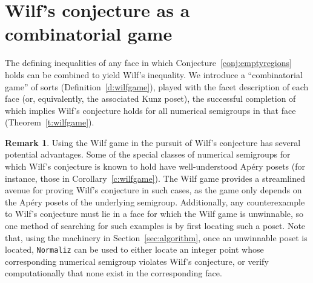 \documentclass[12pt]{amsart}
\theoremstyle{definition}
\newtheorem{remark}[thm]{Remark}
\numberwithin{equation}{section}
\renewcommand\>{\rangle}
\newcommand\<{\langle}
\newcommand\0{\mathbf{0}}
\begin{document}
\section{Wilf's conjecture as a combinatorial game}%
\label{sec:game}%

The defining inequalities of any face in which Conjecture~\ref{conj:emptyregions} holds can be combined to yield Wilf's inequality.  We introduce a ``combinatorial game'' of sorts (Definition~\ref{d:wilfgame}), played with the facet description of each face (or, equivalently, the associated Kunz poset), the successful completion of which implies Wilf's conjecture holds for all numerical semigroups in that face (Theorem~\ref{t:wilfgame}).  

\begin{remark}\label{r:wilfgameadvantages}
Using the Wilf game in the pursuit of Wilf's conjecture has several potential advantages.  Some of the special classes of numerical semigroups for which Wilf's conjecture is known to hold have well-understood Ap\'ery posets (for instance, those in Corollary~\ref{c:wilfgame}).  The Wilf game provides a streamlined avenue for proving Wilf's conjecture in such cases, as the game only depends on the Ap\'ery posets of the underlying semigroup.  
Additionally, any counterexample to Wilf's conjecture must lie in a face for which the Wilf game is unwinnable, so one method of searching for such examples is by first locating such a poset.  Note that, using the machinery in Section~\ref{sec:algorithm}, once an unwinnable poset is located, \texttt{Normaliz} can be used to either locate an integer point whose corresponding numerical semigroup violates Wilf's conjecture, or verify computationally that none exist in the corresponding face.  
\end{remark}
\end{document}
